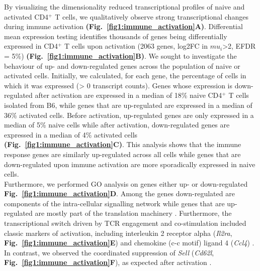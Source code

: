 By visualizing the dimensionality reduced transcriptional profiles of naive and activated CD4$^+$ T cells, we qualitatively observe strong transcriptional changes during immune activation \textbf{(Fig.~\ref{fig1:immune_activation}A)}. Differential mean expression testing identifies thousands of genes being differentially expressed in CD4$^+$ T cells upon activation (2063 genes, log2FC in $mu_i$>2, EFDR = 5\%) \textbf{(Fig.~\ref{fig1:immune_activation}B)}. We sought to investigate the behaviour of up- and down-regulated genes across the population of naive or activated cells. Initially, we calculated, for each gene, the percentage of cells in which it was expressed (> 0 transcript counts). Genes whose expression is down-regulated after activation are expressed in a median of 18\% naive CD4$^+$ T cells isolated from B6, while genes that are up-regulated are expressed in a median of 36\% activated cells. Before activation, up-regulated genes are only expressed in a median of 5\% naive cells while after activation, down-regulated genes are expressed in a median of 4\% activated cells \textbf{(Fig.~\ref{fig1:immune_activation}C)}. This analysis shows that the immune response genes are similarly up-regulated across all cells while genes that are down-regulated upon immune activation are more sporadically expressed in naive cells. \\

Furthermore, we performed GO analysis on genes either up- or down-regulated \textbf{Fig.~\ref{fig1:immune_activation}D}. Among the genes down-regulated are components of the intra-cellular signalling network while genes that are up-regulated are mostly part of the translation machinery \citep{Bjur2013}. Furthermore, the transcriptional switch driven by TCR engagement and co-stimulation included classic markers of activation, including interleukin 2 receptor alpha (\textit{Il2ra}, \textbf{Fig.~\ref{fig1:immune_activation}E}) and chemokine (c-c motif) ligand 4 (\textit{Ccl4}) \citep{Asmal2003}. In contrast, we observed the coordinated suppression of \textit{Sell} (\textit{Cd62l}, \textbf{Fig.~\ref{fig1:immune_activation}F}), as expected after activation \citep{Park2005}.

\newpage


